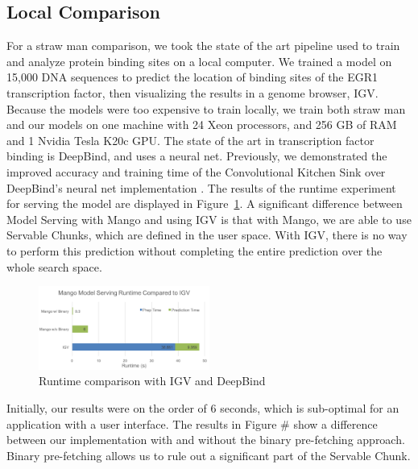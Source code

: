 \documentclass{sig-alternate-05-2015}
\begin{document}
\subsection{Local Comparison}
For a straw man comparison, we took the state of the art pipeline used to train and analyze protein binding sites on a local computer. We trained a model on 15,000 DNA sequences to predict the location of binding sites of the EGR1 transcription factor, then visualizing the results in a genome browser, IGV. Because the models were too expensive to train locally, we train both straw man and our models on one machine with 24 Xeon processors, and 256 GB of RAM and 1 Nvidia Tesla K20c GPU. The state of the art in transcription factor binding is DeepBind, and uses a neural net. Previously, we demonstrated the improved accuracy and training time of the Convolutional Kitchen Sink over DeepBind's neural net implementation \cite{tfbinding}. The results of the runtime experiment for serving the model are displayed in Figure~\ref{fig:igvcomp}. A significant difference between Model Serving with Mango and using IGV is that with Mango, we are able to use Servable Chunks, which are defined in the user space. With IGV, there is no way to perform this prediction without completing the entire prediction over the whole search space.

\begin{figure}
  \label{fig:igvcomp}
  \includegraphics[width=0.5\textwidth]{figures/mangoVsIGV.png}
  \caption{Runtime comparison with IGV and DeepBind}
\end{figure}

Initially, our results were on the order of 6 seconds, which is sub-optimal for an application with a user interface. The results in Figure \# show a difference between our implementation with and without the binary pre-fetching approach. Binary pre-fetching allows us to rule out a significant part of the Servable Chunk.
\end{document}
